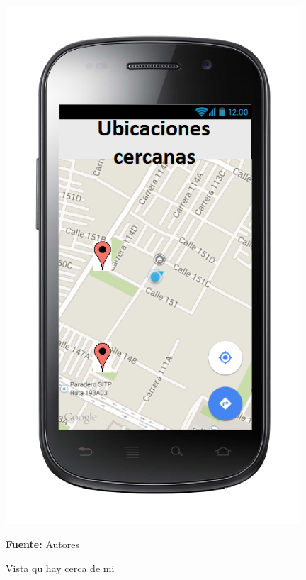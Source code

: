 \begin{figure}[!htb]
  \begin{center}
\includegraphics[width=11cm]{./imagenes/UI/Ubicacion/que_hay_cerca_de_mi.png}
    \caption{Vista qu hay cerca de mi}
    \label{fig:Vista_que_hay_cerca_de_mi}
    \textbf{Fuente:}  Autores
  \end{center}
\end{figure}
